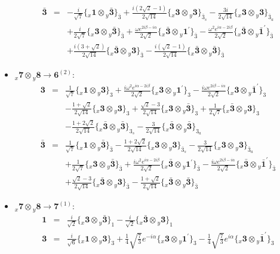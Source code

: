 \documentclass[english]{article}
\newcommand{\rep}[1]{\mathbf{#1}}
\newcommand{\repx}[2]{{}_{#2}\mathbf{#1}}
\newcommand{\subcg}[3]{\big\{ \repx{#1}{x}\otimes\repx{#2}{y}\big\}^{}_{#3}}
\begin{document}
\begin{itemize}
\begin{eqnarray*}
\\
\rep{\bar{3}} &=& -\frac{i}{\sqrt{7}}\subcg{1}{\bar{3}}{\bar{3}}+\frac{i \left(2 \sqrt{2}-1\right)}{2 \sqrt{14}}\subcg{3}{3}{\bar{3}_{s}}-\frac{3 i}{2 \sqrt{14}}\subcg{3}{3}{\bar{3}_{a}} \\ 
 & & +\frac{i}{2 \sqrt{7}}\subcg{3}{\bar{3}}{\bar{3}}+\frac{\omega  e^{2 i \beta -i \alpha }}{2 \sqrt{2}}\subcg{\bar{3}}{1^{\prime}}{\bar{3}}-\frac{\omega ^2 e^{i \alpha -2 i \beta }}{2 \sqrt{2}}\subcg{\bar{3}}{\bar{1}^{\prime}}{\bar{3}} \\ 
 & & +\frac{i \left(3+\sqrt{2}\right)}{2 \sqrt{14}}\subcg{\bar{3}}{3}{\bar{3}}-\frac{i \left(\sqrt{2}-1\right)}{2 \sqrt{14}}\subcg{\bar{3}}{\bar{3}}{\bar{3}}
\end{eqnarray*}
\item $\repx{7}{x}\otimes\repx{8}{y}\to\rep{6}^{(2)}$:
\begin{eqnarray*}
\rep{3} &=& \frac{1}{\sqrt{7}}\subcg{1}{3}{3}+\frac{i \omega ^2 e^{i \alpha -2 i \beta }}{2 \sqrt{2}}\subcg{3}{1^{\prime}}{3}-\frac{i \omega  e^{2 i \beta -i \alpha }}{2 \sqrt{2}}\subcg{3}{\bar{1}^{\prime}}{3} \\ 
 & & -\frac{1+\sqrt{2}}{2 \sqrt{14}}\subcg{3}{3}{3}+\frac{\sqrt{2}-3}{2 \sqrt{14}}\subcg{3}{\bar{3}}{3}+\frac{1}{2 \sqrt{7}}\subcg{\bar{3}}{3}{3} \\ 
 & & -\frac{1+2 \sqrt{2}}{2 \sqrt{14}}\subcg{\bar{3}}{\bar{3}}{3_{s}}-\frac{3}{2 \sqrt{14}}\subcg{\bar{3}}{\bar{3}}{3_{a}}
\\
\rep{\bar{3}} &=& \frac{1}{\sqrt{7}}\subcg{1}{\bar{3}}{\bar{3}}-\frac{1+2 \sqrt{2}}{2 \sqrt{14}}\subcg{3}{3}{\bar{3}_{s}}-\frac{3}{2 \sqrt{14}}\subcg{3}{3}{\bar{3}_{a}} \\ 
 & & +\frac{1}{2 \sqrt{7}}\subcg{3}{\bar{3}}{\bar{3}}+\frac{i \omega ^2 e^{i \alpha -2 i \beta }}{2 \sqrt{2}}\subcg{\bar{3}}{1^{\prime}}{\bar{3}}-\frac{i \omega  e^{2 i \beta -i \alpha }}{2 \sqrt{2}}\subcg{\bar{3}}{\bar{1}^{\prime}}{\bar{3}} \\ 
 & & +\frac{\sqrt{2}-3}{2 \sqrt{14}}\subcg{\bar{3}}{3}{\bar{3}}-\frac{1+\sqrt{2}}{2 \sqrt{14}}\subcg{\bar{3}}{\bar{3}}{\bar{3}}
\end{eqnarray*}
\item $\repx{7}{x}\otimes\repx{8}{y}\to\rep{7}^{(1)}$:
\begin{eqnarray*}
\rep{1} &=& \frac{i}{\sqrt{2}}\subcg{3}{\bar{3}}{1}-\frac{i}{\sqrt{2}}\subcg{\bar{3}}{3}{1}
\\
\rep{3} &=& \frac{i}{\sqrt{6}}\subcg{1}{3}{3}+\frac{1}{4} \sqrt{\frac{7}{3}} e^{-i \alpha }\subcg{3}{1^{\prime}}{3}-\frac{1}{4} \sqrt{\frac{7}{3}} e^{i \alpha }\subcg{3}{\bar{1}^{\prime}}{3} \\ 

\end{eqnarray*}
\end{itemize}
\end{document}
